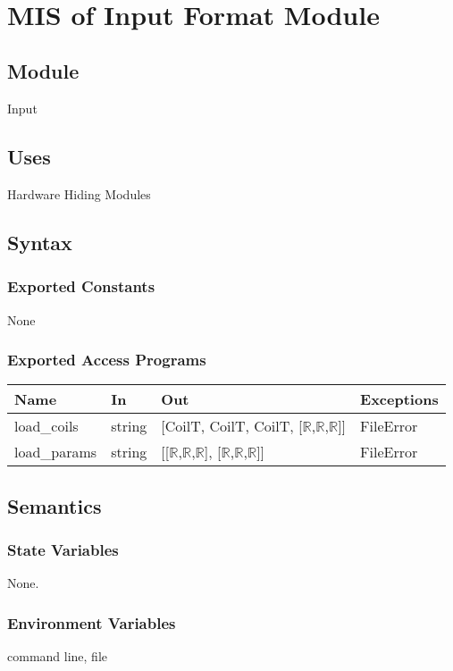 \documentclass[12pt, titlepage]{article}
\begin{document}
\newpage
~\newpage

\section{MIS of Input Format Module} \label{MIF}

\subsection{Module}
Input

\subsection{Uses}
Hardware Hiding Modules

\subsection{Syntax}

\subsubsection{Exported Constants}
None
\subsubsection{Exported Access Programs}

\begin{center}
\begin{tabular}{p{3cm} p{3cm} p{4cm} p{2cm}}
\hline
\textbf{Name} & \textbf{In} & \textbf{Out} & \textbf{Exceptions} \\
\hline
load\_coils & string & [CoilT, CoilT, CoilT, [$\mathbb{R}$,$\mathbb{R}$,$\mathbb{R}$]] & FileError  \\
\hline
load\_params & string & [[$\mathbb{R}$,$\mathbb{R}$,$\mathbb{R}$], [$\mathbb{R}$,$\mathbb{R}$,$\mathbb{R}$]]  & FileError  \\
\hline
\end{tabular}
\end{center}

\subsection{Semantics}

\subsubsection{State Variables}
None.
\subsubsection{Environment Variables}
command line, file
\end{document}
